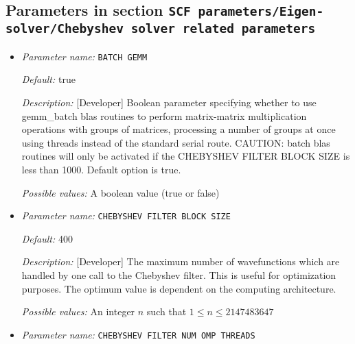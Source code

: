\subsection{Parameters in section \tt SCF parameters/Eigen-solver/Chebyshev solver related parameters}
\label{parameters:SCF_20parameters/Eigen_2dsolver_2fChebyshev_20solver_20related_20parameters}

\begin{itemize}
\item {\it Parameter name:} {\tt BATCH GEMM}
\label{parameters:SCF parameters/Eigen_2dsolver_2fChebyshev solver related parameters/BATCH GEMM}
\label{parameters:SCF_20parameters/Eigen_2dsolver_2fChebyshev_20solver_20related_20parameters/BATCH_20GEMM}




{\it Default:} true


{\it Description:} [Developer] Boolean parameter specifying whether to use gemm\_batch blas routines to perform matrix-matrix multiplication operations with groups of matrices, processing a number of groups at once using threads instead of the standard serial route. CAUTION: batch blas routines will only be activated if the CHEBYSHEV FILTER BLOCK SIZE is less than 1000. Default option is true.


{\it Possible values:} A boolean value (true or false)
\item {\it Parameter name:} {\tt CHEBYSHEV FILTER BLOCK SIZE}
\label{parameters:SCF parameters/Eigen_2dsolver_2fChebyshev solver related parameters/CHEBYSHEV FILTER BLOCK SIZE}
\label{parameters:SCF_20parameters/Eigen_2dsolver_2fChebyshev_20solver_20related_20parameters/CHEBYSHEV_20FILTER_20BLOCK_20SIZE}




{\it Default:} 400


{\it Description:} [Developer] The maximum number of wavefunctions which are handled by one call to the Chebyshev filter. This is useful for optimization purposes. The optimum value is dependent on the computing architecture.


{\it Possible values:} An integer $n$ such that $1\leq n \leq 2147483647$
\item {\it Parameter name:} {\tt CHEBYSHEV FILTER NUM OMP THREADS}
\label{parameters:SCF parameters/Eigen_2dsolver_2fChebyshev solver related parameters/CHEBYSHEV FILTER NUM OMP THREADS}
\label{parameters:SCF_20parameters/Eigen_2dsolver_2fChebyshev_20solver_20related_20parameters/CHEBYSHEV_20FILTER_20NUM_20OMP_20THREADS}



\end{itemize}
